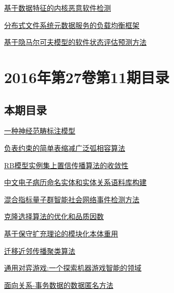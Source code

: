 \documentclass[a4paper]{article}
\begin{document}
\href{http://www.jos.org.cn/ch/reader/create_pdf.aspx?file_no=4927&year_id=2016&quarter_id=12&falg=1}{基于数据特征的内核恶意软件检测}

\href{http://www.jos.org.cn/ch/reader/create_pdf.aspx?file_no=4930&year_id=2016&quarter_id=12&falg=1}{分布式文件系统元数据服务的负载均衡框架}

\href{http://www.jos.org.cn/ch/reader/create_pdf.aspx?file_no=5014&year_id=2016&quarter_id=12&falg=1}{基于隐马尔可夫模型的软件状态评估预测方法}


\section{\textbf{2016年第27卷第11期目录}}
\subsection{本期目录}
\href{http://www.jos.org.cn/ch/reader/create_pdf.aspx?file_no=4873&year_id=2016&quarter_id=11&falg=1}{一种神经范畴标注模型}

\href{http://www.jos.org.cn/ch/reader/create_pdf.aspx?file_no=4874&year_id=2016&quarter_id=11&falg=1}{负表约束的简单表缩减广泛弧相容算法}

\href{http://www.jos.org.cn/ch/reader/create_pdf.aspx?file_no=4877&year_id=2016&quarter_id=11&falg=1}{RB模型实例集上置信传播算法的收敛性}

\href{http://www.jos.org.cn/ch/reader/create_pdf.aspx?file_no=4880&year_id=2016&quarter_id=11&falg=1}{中文电子病历命名实体和实体关系语料库构建}

\href{http://www.jos.org.cn/ch/reader/create_pdf.aspx?file_no=4910&year_id=2016&quarter_id=11&falg=1}{混合指标量子群智能社会网络事件检测方法}

\href{http://www.jos.org.cn/ch/reader/create_pdf.aspx?file_no=4911&year_id=2016&quarter_id=11&falg=1}{克隆选择算法的优化和品质因数}

\href{http://www.jos.org.cn/ch/reader/create_pdf.aspx?file_no=4920&year_id=2016&quarter_id=11&falg=1}{基于保守扩充理论的模块化本体重用}

\href{http://www.jos.org.cn/ch/reader/create_pdf.aspx?file_no=4921&year_id=2016&quarter_id=11&falg=1}{迁移近邻传播聚类算法}

\href{http://www.jos.org.cn/ch/reader/create_pdf.aspx?file_no=4928&year_id=2016&quarter_id=11&falg=1}{通用对弈游戏:一个探索机器游戏智能的领域}

\href{http://www.jos.org.cn/ch/reader/create_pdf.aspx?file_no=5099&year_id=2016&quarter_id=11&falg=1}{面向关系-事务数据的数据匿名方法}
\end{document}
